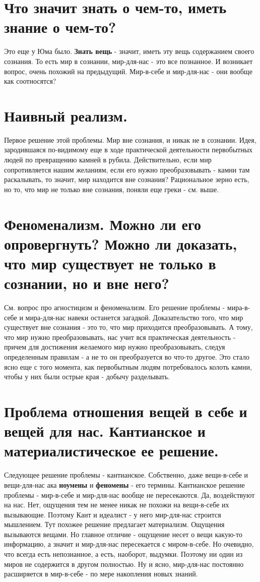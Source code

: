 \section{ Что значит знать о чем-то, иметь знание о чем-то?}
Это еще у Юма было. \textbf{Знать вещь} - значит, иметь эту вещь содержанием своего сознания. То есть мир в сознании, мир-для-нас - это все познанное. И возникает вопрос, очень похожий на предыдущий. Мир-в-себе и мир-для-нас - они вообще как соотносятся?

\section{ Наивный реализм.}
Первое решение этой проблемы. Мир вне сознания, и никак не в сознании. Идея, зародившаяся по-видимому еще в ходе практической деятельности первобытных людей по превращению камней в рубила. Действительно, если мир сопротивляется нашим желаниям, если его нужно преобразовывать - камни там раскалывать, то значит, мир находится вне сознания? Рациональное зерно есть, но то, что мир не только вне сознания, поняли еще греки - см. выше.

\section{ Феноменализм. Можно ли его опровергнуть? Можно ли доказать, что мир существует не только в сознании, но и вне него?}
См. вопрос про агностицизм и феноменализм. Его решение проблемы - мира-в-себе и мира-для-нас навеки останется загадкой. Доказательство того, что мир существует вне сознания - это то, что мир приходится преобразовывать. А тому, что мир нужно преобразовывать, нас учит вся практическая деятельность - причем для достижения желаемого мир нужно преобразовывать, следуя определенным правилам - а не то он преобразуется во что-то другое. Это стало ясно еще с того момента, как первобытным людям потребовалось колоть камни, чтобы у них были острые края - добычу разделывать.

\section{ Проблема отношения вещей в себе и вещей для нас. Кантианское и материалистическое ее решение.}
Следующее решение проблемы - кантианское. Собственно, даже вещи-в-себе и вещи-для-нас ака \textbf{ноумены} и \textbf{феномены} - его термины. Кантианское решение проблемы - мир-в-себе и мир-для-нас вообще не пересекаются. Да, воздействуют на нас. Нет, ощущения тем не менее никак не похожи на вещи-в-себе их вызывающие. Поэтому Кант и идеалист - у него мир-для-нас строится мышлением. Тут похожее решение предлагает материализм. Ощущения вызываются вещами. Но главное отличие - ощущение несет о вещи какую-то информацию, а значит и мир-для-нас пересекается с миром-в-себе. Но очевидно, что всегда есть непознанное, а есть, наоборот, выдумки. Поэтому ни один из миров не содержится в другом полностью. Ну и ясно, мир-для-нас постоянно расширяется в мир-в-себе - по мере накопления новых знаний.

